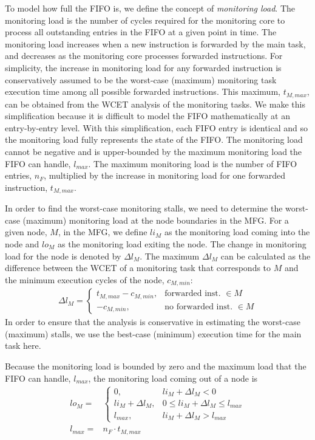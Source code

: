 To model how full the FIFO is, we define the concept of \emph{monitoring load}.
The monitoring load is the number of cycles required for the monitoring core to
process all outstanding entries in the FIFO at a given point in time. The
monitoring load increases when a new instruction is forwarded by the main task,
and decreases as the monitoring core processes forwarded instructions. For
simplicity, the increase in monitoring load for any forwarded instruction is
conservatively assumed to be the worst-case (maximum) monitoring task execution
time among all possible forwarded instructions. This maximum, $t_{M, max}$, can
be obtained from the WCET analysis of the monitoring tasks.  We make this
simplification because it is difficult to model the FIFO mathematically at an
entry-by-entry level. With this simplification, each FIFO entry is identical
and so the monitoring load fully represents the state of the FIFO.  The
monitoring load cannot be negative and is upper-bounded by the maximum
monitoring load the FIFO can handle, $l_{max}$. The maximum monitoring load is
the number of FIFO entries, $n_F$, multiplied by the increase in monitoring
load for one forwarded instruction, $t_{M, max}$.

In order to find the worst-case monitoring stalls, we need to determine the
worst-case (maximum) monitoring load at the node boundaries in the MFG. For a
given node, $M$, in the MFG, we define $li_{M}$ as the monitoring load coming
into the node and $lo_{M}$ as the monitoring load exiting the node. The change
in monitoring load for the node is denoted by $\Delta l_{M}$. The maximum
$\Delta l_{M}$ can be calculated as the difference between the WCET of a
monitoring task that corresponds to $M$ and the minimum execution cycles of the
node, $c_{M,min}$: 
\begin{align*}
\Delta l_{M} = 
	\begin{cases}
	t_{M,max} - c_{M,min}, &\text{forwarded inst. } \in M \\
	- c_{M,min}, &\text{no forwarded inst. } \in M
	\end{cases}
\end{align*}
In order to ensure that the analysis is conservative in estimating the
worst-case (maximum) stalls, we use the best-case (minimum) execution time for
the main task here. 

Because the monitoring load is bounded by zero and the maximum load that
the FIFO can handle, $l_{max}$, the monitoring load coming out of a node is
\begin{align*}
	lo_{M} =& 
		\begin{cases}
			0, &li_{M} + \Delta l_{M} < 0 \\
			li_{M} + \Delta l_{M}, &0 \leq li_{M} + \Delta l_{M} \leq l_{max} \\
			l_{max}, &li_{M} + \Delta l_{M} > l_{max}
		\end{cases} \\
  l_{max} =& n_F \cdot t_{M,max}
\end{align*}

